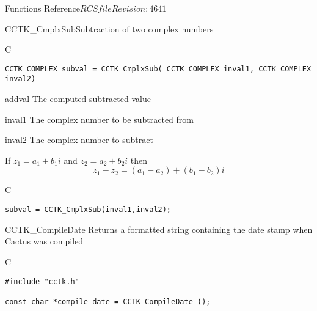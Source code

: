 \begin{cactuspart}{ Functions Reference}{$RCSfile$}{$Revision: 4641 $}
\begin{FunctionDescription}{CCTK\_CmplxSub}{Subtraction of two complex numbers}
\label{CCTK-CmplxSub}
\begin{SynopsisSection}
\begin{Synopsis}{C}
\begin{verbatim}CCTK_COMPLEX subval = CCTK_CmplxSub( CCTK_COMPLEX inval1, CCTK_COMPLEX inval2)\end{verbatim}
\end{Synopsis}
\end{SynopsisSection}
\begin{ParameterSection}
\begin{Parameter}{addval}
The computed subtracted value
\end{Parameter}
\begin{Parameter}{inval1}
The complex number to be subtracted from
\end{Parameter}
\begin{Parameter}{inval2}
The complex number to subtract
\end{Parameter}
\end{ParameterSection}
\begin{Discussion}
If $z_1=a_1 + b_1 i$ and $z_2 = a_2+ b_2 i$ then
$$
z_1-z_2 = (a_1-a_2)+ (b_1 - b_2)i
$$
\end{Discussion}
\begin{ExampleSection}
\begin{Example}{C}
\begin{verbatim}
subval = CCTK_CmplxSub(inval1,inval2);
\end{verbatim}
\end{Example}
\end{ExampleSection}
\end{FunctionDescription}


\begin{FunctionDescription}{CCTK\_CompileDate}
\label{CCTK-CompileDate}
Returns a formatted string containing the date stamp when Cactus was compiled

\begin{SynopsisSection}
\begin{Synopsis}{C}
\begin{verbatim}
#include "cctk.h"

const char *compile_date = CCTK_CompileDate ();
\end{verbatim}
\end{Synopsis}
\end{SynopsisSection}


\end{FunctionDescription}
\end{cactuspart}
